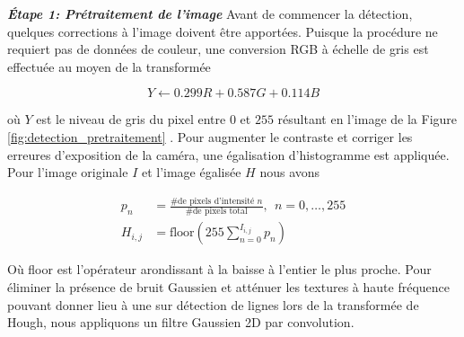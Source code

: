 \textbf{\textit{Étape 1: Prétraitement de l'image}} Avant de commencer la détection, quelques corrections à l'image doivent être apportées. Puisque la procédure ne requiert pas de données de couleur, une conversion RGB à échelle de gris est effectuée au moyen de la transformée

\[
 Y \leftarrow 0.299 R + 0.587 G + 0.114 B
\]

où $Y$ est le niveau de gris du pixel entre $0$ et $255$ résultant en l'image de la Figure \ref{fig:detection_pretraitement} . Pour augmenter le contraste et corriger les erreures d'exposition de la caméra, une égalisation d'histogramme est appliquée. Pour l'image originale $I$ et l'image égalisée $H$ nous avons

\begin{align}
  p_n &= \frac{\text{\# de pixels d'intensité } n }{\text{\# de pixels total}}, \ \ n = 0, \ldots, 255 \\ 
  H_{i,j} &= \text{floor}(255 \sum_{n=0}^{I_{i,j}} p_n)
\end{align}

Où floor est l'opérateur arondissant à la baisse à l'entier le plus proche. Pour éliminer la présence de bruit Gaussien et atténuer les textures à haute fréquence pouvant donner lieu à une sur détection de lignes lors de la transformée de Hough, nous appliquons un filtre Gaussien 2D par convolution.


